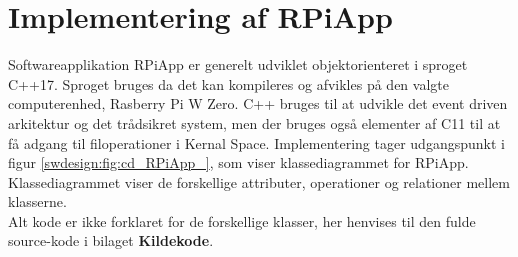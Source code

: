 \documentclass[Softwaredesign/Softwaredesign_main.tex]{subfiles}
\begin{document}
\section{Implementering af RPiApp}
Softwareapplikation RPiApp er generelt udviklet objektorienteret i sproget C++17. Sproget bruges da det kan kompileres og afvikles på den valgte computerenhed, Rasberry Pi W Zero. C++ bruges til at udvikle det event driven arkitektur og det trådsikret system, men der bruges også elementer af C11 til at få adgang til filoperationer i Kernal Space. Implementering tager udgangspunkt i figur \ref{swdesign:fig:cd_RPiApp_}, som viser klassediagrammet for RPiApp. Klassediagrammet viser de forskellige attributer, operationer og relationer mellem klasserne. \\
Alt kode er ikke forklaret for de forskellige klasser, her henvises til den fulde source-kode i bilaget \textbf{Kildekode}. 
\end{document}

